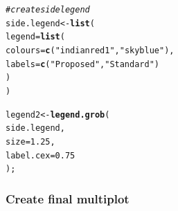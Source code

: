 \documentclass[letterpaper]{article}\usepackage[]{graphicx}\usepackage[]{color}
\makeatletter
\newcommand{\hlnum}[1]{\textcolor[rgb]{0.686,0.059,0.569}{#1}}%
\newcommand{\hlstr}[1]{\textcolor[rgb]{0.192,0.494,0.8}{#1}}%
\newcommand{\hlcom}[1]{\textcolor[rgb]{0.678,0.584,0.686}{\textit{#1}}}%
\newcommand{\hlstd}[1]{\textcolor[rgb]{0.345,0.345,0.345}{#1}}%
\newcommand{\hlkwb}[1]{\textcolor[rgb]{0.69,0.353,0.396}{#1}}%
\newcommand{\hlkwc}[1]{\textcolor[rgb]{0.333,0.667,0.333}{#1}}%
\newcommand{\hlkwd}[1]{\textcolor[rgb]{0.737,0.353,0.396}{\textbf{#1}}}%
\newenvironment{kframe}{%
 \def\at@end@of@kframe{}%
 \ifinner\ifhmode%
  \def\at@end@of@kframe{\end{minipage}}%
  \begin{minipage}{\columnwidth}%
 \fi\fi%
 \def\FrameCommand##1{\hskip\@totalleftmargin \hskip-\fboxsep
 \colorbox{shadecolor}{##1}\hskip-\fboxsep
     \hskip-\linewidth \hskip-\@totalleftmargin \hskip\columnwidth}%
 \MakeFramed {\advance\hsize-\width
   \@totalleftmargin\z@ \linewidth\hsize
   \@setminipage}}%
 {\par\unskip\endMakeFramed%
 \at@end@of@kframe}
\newenvironment{knitrout}{}{} %
\makeatother
\begin{document}
\begin{knitrout}
\begin{kframe}
\begin{alltt}
\hlcom{# create side legend}
\hlstd{side.legend} \hlkwb{<-} \hlkwd{list}\hlstd{(}
    \hlkwc{legend} \hlstd{=} \hlkwd{list}\hlstd{(}
        \hlkwc{colours} \hlstd{=} \hlkwd{c}\hlstd{(}\hlstr{"indianred1"}\hlstd{,} \hlstr{"skyblue"}\hlstd{),}
        \hlkwc{labels}  \hlstd{=} \hlkwd{c}\hlstd{(}\hlstr{"Proposed"}\hlstd{,} \hlstr{"Standard"}\hlstd{)}
        \hlstd{)}
    \hlstd{)}

\hlstd{legend2} \hlkwb{<-} \hlkwd{legend.grob}\hlstd{(}
    \hlstd{side.legend,}
    \hlkwc{size} \hlstd{=} \hlnum{1.25}\hlstd{,}
    \hlkwc{label.cex} \hlstd{=} \hlnum{0.75}
    \hlstd{);}
\end{alltt}
\end{kframe}
\end{knitrout}

\subsubsection{Create final multiplot}
\end{document}
